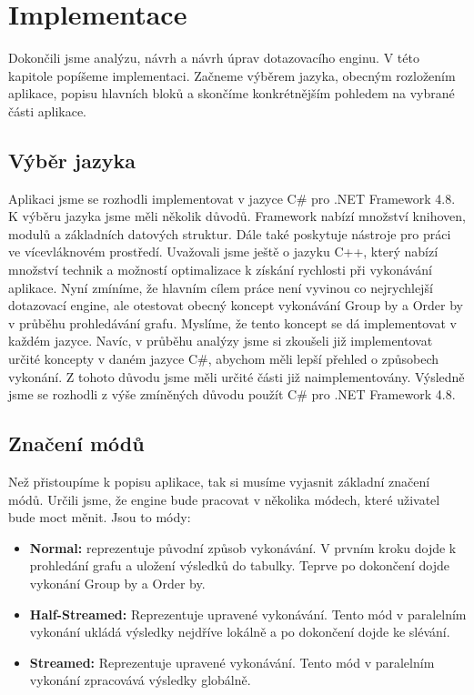 \chapter{Implementace}
\label{impl}
   
Dokončili jsme analýzu, návrh a návrh úprav dotazovacího enginu.
V této kapitole popíšeme implementaci.
Začneme výběrem jazyka, obecným rozložením aplikace, popisu hlavních bloků a skončíme konkrétnějším pohledem na vybrané části aplikace.

\section{Výběr jazyka}

Aplikaci jsme se rozhodli implementovat v jazyce C\# pro .NET Framework 4.8.
K výběru jazyka jsme měli několik důvodů.
Framework nabízí množství knihoven, modulů a základních datových struktur.
Dále také poskytuje nástroje pro práci ve vícevláknovém prostředí.
Uvažovali jsme ještě o jazyku C++, který nabízí množství technik a možností optimalizace k získání rychlosti při vykonávání aplikace. 
Nyní zmíníme, že hlavním cílem práce není vyvinou co nejrychlejší dotazovací engine, ale otestovat obecný koncept vykonávání Group by a Order by v průběhu prohledávání grafu.
Myslíme, že tento koncept se dá implementovat v každém jazyce.
Navíc, v průběhu analýzy jsme si zkoušeli již implementovat určité koncepty v daném jazyce C\#, abychom měli lepší přehled o způsobech vykonání.
Z tohoto důvodu jsme měli určité části již naimplementovány.
Výsledně jsme se rozhodli z výše zmíněných důvodu použít C\# pro .NET Framework 4.8.

\section{Značení módů}

Než přistoupíme k popisu aplikace, tak si musíme vyjasnit základní značení módů.
Určili jsme, že engine bude pracovat v několika módech, které uživatel bude moct měnit.
Jsou to módy:

\begin{itemize}

\item \textbf{Normal:} reprezentuje původní způsob vykonávání.
V prvním kroku dojde k prohledání grafu a uložení výsledků do tabulky.
Teprve po dokončení dojde vykonání Group by a Order by.

\item \textbf{Half-Streamed:} Reprezentuje upravené vykonávání. 
Tento mód v paralelním vykonání ukládá výsledky nejdříve lokálně a po dokončení dojde ke slévání.

\item \textbf{Streamed:} Reprezentuje upravené vykonávání. 
Tento mód v paralelním vykonání zpracovává výsledky globálně.
\end{itemize}

